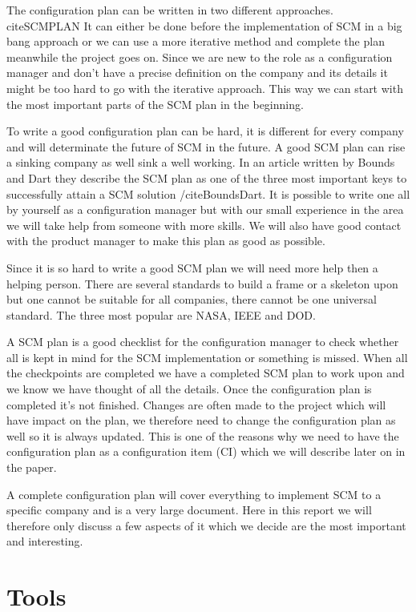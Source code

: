 \documentclass[a4paper,10pt]{article}
\begin{document}
The configuration plan can be written in two different approaches.
cite{SCMPLAN} It can either be done before the implementation of SCM in a big bang approach or we can use a more iterative method and complete the plan meanwhile the project goes on.
Since we are new to the role as a configuration manager and don't have a precise definition on the company and its details it might be too hard to go with the iterative approach.
This way we can start with the most important parts of the SCM plan in the beginning.

To write a good configuration plan can be hard, it is different for every company and will determinate the future of SCM in the future.
A good SCM plan can rise a sinking company as well sink a well working.
In an article written by Bounds and Dart they describe the SCM plan as one of the three most important keys to successfully attain a SCM solution /cite{BoundsDart}.
It is possible to write one all by yourself as a configuration manager but with our small experience in the area we will take help from someone with more skills.
We will also have good contact with the product manager to make this plan as good as possible.

Since it is so hard to write a good SCM plan we will need more help then a helping person. There are several standards to build a frame or a skeleton upon but one cannot be suitable for all companies, there cannot be one universal standard.
The three most popular are NASA, IEEE and DOD. \cite{SCMPLAN}

A SCM plan is a good checklist for the configuration manager to check whether all is kept in mind for the SCM implementation or something is missed.
When all the checkpoints are completed we have a completed SCM plan to work upon and we know we have thought of all the details.
Once the configuration plan is completed it's not finished.
Changes are often made to the project which will have impact on the plan, we therefore need to change the configuration plan as well so it is always updated.
This is one of the reasons why we need to have the configuration plan as a configuration item (CI) which we will describe later on in the paper.

A complete configuration plan will cover everything to implement SCM to a specific company and is a very large document.
Here in this report we will therefore only discuss a few aspects of it which we decide are the most important and interesting.

\section{Tools}
\end{document}
